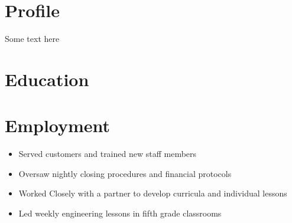\documentclass[12 pt]{resume}
\begin{document}

    \section{Profile}
    Some text here

    \section{Education}

    \section{Employment}
        \begin{itemize}[noitemsep]
            \item Served customers and trained new staff members
            \item Oversaw nightly closing procedures and financial protocols
        \end{itemize}
        \begin{itemize}[noitemsep]
            \item Worked Closely with a partner to develop curricula and individual lessons
            \item Led weekly engineering lessons in fifth grade classrooms
        \end{itemize}
\end{document}
